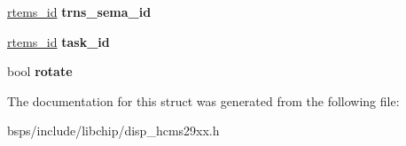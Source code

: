 \begin{DoxyCompactItemize}
\mbox{\hyperlink{group__ClassicTasks_gab20892b814dced7dd4e5b9bf42becd57}{rtems\+\_\+id}} {\bfseries trns\+\_\+sema\+\_\+id}
\item 
\mbox{\label{structspi__disp__hcms29xx__param__t_af94433060df7dd7f289a933a12d0bdfe}} 
\mbox{\hyperlink{group__ClassicTasks_gab20892b814dced7dd4e5b9bf42becd57}{rtems\+\_\+id}} {\bfseries task\+\_\+id}
\item 
\mbox{\label{structspi__disp__hcms29xx__param__t_a9d3efe86816fb2e73e9862da6a9b57fb}} 
bool {\bfseries rotate}
\end{DoxyCompactItemize}


The documentation for this struct was generated from the following file\+:\begin{DoxyCompactItemize}
\item 
bsps/include/libchip/disp\+\_\+hcms29xx.\+h\end{DoxyCompactItemize}
